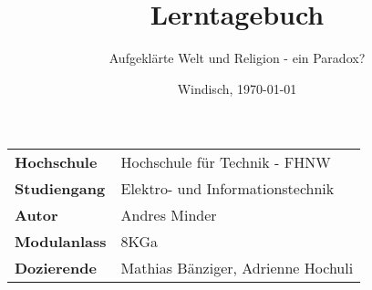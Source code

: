 \documentclass[final]{fhnwreport}       %
\title{\Huge{\textbf{Lerntagebuch}}\\}          %
\author{\huge{\glqq Aufgeklärte Welt und Religion - ein Paradox?\grqq}}          %
\date{Windisch, \today}             %
\begin{document}
\maketitle
\vspace*{-0.5cm}						    %
\vfill
\begin{figure}[H]
\centering
\end{figure}
\vfill

{
\renewcommand\arraystretch{2}
\begin{center}
\begin{tabular}{>{\bf}p{4cm} l}
Hochschule                 &    Hochschule für Technik - FHNW\\
Studiengang                &    Elektro- und Informationstechnik\\
Autor	  		           & 	Andres Minder\\
Modulanlass	               &    8KGa\\
Dozierende                 &    Mathias Bänziger, Adrienne Hochuli\\
\end{tabular}
\end{center}
}

\clearpage
			
\thispagestyle{empty}
%

\clearpage


\setcounter{page}{1}
\tableofcontents



{\sloppypar
\printbibliography[heading=bibintoc]
\label{sec:lit}
}

%

\ifdraft{%
\newpage
\clearpage
}
{%
}
\end{document}
